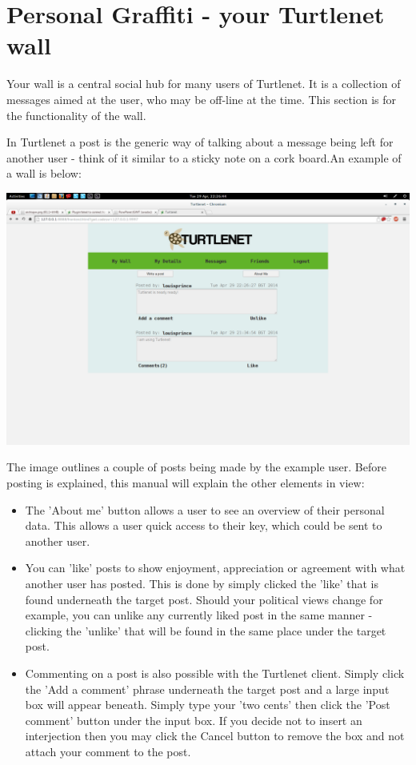 \pagebreak
\section{Personal Graffiti - your Turtlenet wall}
Your wall is a central social hub for many users of Turtlenet. It is a
collection of messages aimed at the user, who may be off-line at the time.
This section is for the functionality of the wall.

In Turtlenet a post is the generic way of talking about a message being left for
another user - think of it similar to a sticky note on a cork board.An example
of a wall is below:

\includegraphics[scale=0.2]{screenshots/Screenshot from 2014-04-29 22-26-44}

The image outlines a couple of posts being made by the example user. Before 
posting is explained, this manual will explain the other elements in view:

\begin{itemize}
\item The 'About me' button allows a user to see an overview of their personal
      data. This allows a user quick access to their key, which could be sent to
      another user.
\item You can 'like' posts to show enjoyment, appreciation or agreement with
      what another user has posted. This is done by simply clicked the 'like'
      that is found underneath the target post. Should your political views
      change for example, you can unlike any currently liked post in the same
      manner - clicking the 'unlike' that will be found in the same place under
      the target post.
\item Commenting on a post is also possible with the Turtlenet client. Simply
      click the 'Add a comment' phrase underneath the target post and a large
      input box will appear beneath. Simply type your 'two cents' then click
      the 'Post comment' button under the input box. If you decide not to
      insert an interjection then you may click the Cancel button to remove the
      box and not attach your comment to the post.
\end{itemize}

